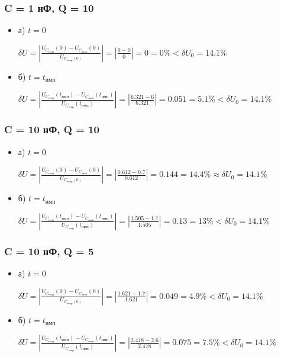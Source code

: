 \documentclass[a4paper,14pt]{extarticle}
\begin{document}
\subsubsection{C = 1 нФ, Q = 10}

\begin{itemize}
\item[] а) $t = 0$

	$\delta U = \left| \frac{U_{C_\text{теор}}(0) - U_{C_\text{эксп}}(0)}{U_{C_\text{теор}(0)}} \right| = \left| \frac{0 - 0}{0} \right| = 0 = 0\% < \delta U_0 = 14.1\%$

\item[] б) $t = t_\text{имп}$

	$\delta U = \left| \frac{U_{C_\text{теор}}(t_\text{имп}) - U_{C_\text{эксп}}(t_\text{имп})}{U_{C_\text{теор}}(t_\text{имп})} \right| = \left| \frac{6.321 - 6}{6.321} \right| = 0.051 = 5.1\% < \delta U_0 = 14.1\%$
\end{itemize}

\subsubsection{C = 10 нФ, Q = 10}

\begin{itemize}
\item[] а) $t = 0$

	$\delta U = \left| \frac{U_{C_\text{теор}}(0) - U_{C_\text{эксп}}(0)}{U_{C_\text{теор}(0)}} \right| = \left| \frac{0.612 - 0.7}{0.612} \right| = 0.144 = 14.4\% \approx \delta U_0 = 14.1\%$

\item[] б) $t = t_\text{имп}$

	$\delta U = \left| \frac{U_{C_\text{теор}}(t_\text{имп}) - U_{C_\text{эксп}}(t_\text{имп})}{U_{C_\text{теор}}(t_\text{имп})} \right| = \left| \frac{1.505 - 1.7}{1.505} \right| = 0.13 = 13\% < \delta U_0 = 14.1\%$
\end{itemize}

\subsubsection{C = 10 нФ, Q = 5}

\begin{itemize}
\item[] а) $t = 0$

	$\delta U = \left| \frac{U_{C_\text{теор}}(0) - U_{C_\text{эксп}}(0)}{U_{C_\text{теор}(0)}} \right| = \left| \frac{1.621 - 1.7}{1.621} \right| = 0.049 = 4.9\% < \delta U_0 = 14.1\%$

\item[] б) $t = t_\text{имп}$

	$\delta U = \left| \frac{U_{C_\text{теор}}(t_\text{имп}) - U_{C_\text{эксп}}(t_\text{имп})}{U_{C_\text{теор}}(t_\text{имп})} \right| = \left| \frac{2.418 - 2.6}{2.418} \right| = 0.075 = 7.5\% < \delta U_0 = 14.1\%$
\end{itemize}
\end{document}
